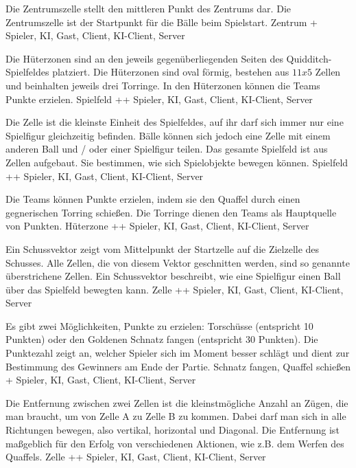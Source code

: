         {Die Zentrumszelle stellt den mittleren Punkt des Zentrums dar.}
        {Die Zentrumszelle ist der Startpunkt für die Bälle beim Spielstart.}
        {Zentrum}
        {+}
        {Spieler, KI, Gast, Client, KI-Client, Server}

        {Die Hüterzonen sind an den jeweils gegenüberliegenden Seiten des Quidditch-Spielfeldes platziert. Die Hüterzonen sind oval förmig, bestehen aus $11x5$ Zellen und beinhalten jeweils drei Torringe.}
        {In den Hüterzonen können die Teams Punkte erzielen.}
        {Spielfeld}
        {++}
        {Spieler, KI, Gast, Client, KI-Client, Server}
        
        {Die Zelle ist die kleinste Einheit des Spielfeldes, auf ihr darf sich immer nur eine Spielfigur gleichzeitig befinden. Bälle können sich jedoch eine Zelle mit einem anderen Ball und / oder einer Spielfigur teilen.}
        {Das gesamte Spielfeld ist aus Zellen aufgebaut. Sie bestimmen, wie sich Spielobjekte bewegen können.}
        {Spielfeld}
        {++}
        {Spieler, KI, Gast, Client, KI-Client, Server}

        {Die Teams können Punkte erzielen, indem sie den Quaffel durch einen gegnerischen Torring schießen.}
        {Die Torringe dienen den Teams als Hauptquelle von Punkten.}
        {Hüterzone}
        {++}
        {Spieler, KI, Gast, Client, KI-Client, Server}
        
        {Ein Schussvektor zeigt vom Mittelpunkt der Startzelle auf die Zielzelle des Schusses. Alle Zellen, die von diesem Vektor geschnitten werden, sind so genannte überstrichene Zellen.}
        {Ein Schussvektor beschreibt, wie eine Spielfigur einen Ball über das Spielfeld bewegten kann.}
        {Zelle}
        {++}
        {Spieler, KI, Gast, Client, KI-Client, Server}
        
        {Es gibt zwei Möglichkeiten, Punkte zu erzielen: Torschüsse (entspricht 10 Punkten) oder den Goldenen Schnatz fangen (entspricht 30 Punkten).}
        {Die Punktezahl zeigt an, welcher Spieler sich im Moment besser schlägt und dient zur Bestimmung des Gewinners am Ende der Partie.}
        {Schnatz fangen, Quaffel schießen}
        {+}
        {Spieler, KI, Gast, Client, KI-Client, Server}

        {Die Entfernung zwischen zwei Zellen ist die kleinstmögliche Anzahl an Zügen, die man braucht, um von Zelle A zu Zelle B zu kommen. Dabei darf  man sich in alle Richtungen bewegen, also vertikal, horizontal und Diagonal.}
        {Die Entfernung ist maßgeblich für den Erfolg von verschiedenen Aktionen, wie z.B. dem Werfen des Quaffels.}
        {Zelle}
        {++}
        {Spieler, KI, Gast, Client, KI-Client, Server}

